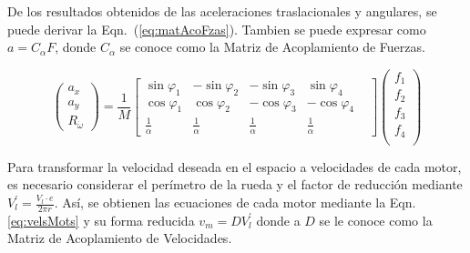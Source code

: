 \documentclass[twocolumn,10pt]{amrob}
\begin{document}

De los resultados obtenidos de las aceleraciones traslacionales y angulares, se puede derivar la Eqn.~(\ref{eq:matAcoFzas}). Tambien se puede expresar como \(a=C_\alpha F \), donde \( C_\alpha \) se conoce como la Matriz de Acoplamiento de Fuerzas. \par

\begin{equation}
  \left(\begin{array}{c}
    a_x \\ a_y \\R_{\dot{\omega}}
  \end{array}\right)= \frac{1}{M}
  \begin{bmatrix}
    \sin\varphi_1 & -\sin\varphi_2 & -\sin\varphi_3 & \sin\varphi_4 \\
    \cos\varphi_1 & \cos\varphi_2 & -\cos\varphi_3 & -\cos\varphi_4 & \\
    \frac{1}{\alpha} & \frac{1}{\alpha}  & \frac{1}{\alpha}  &\frac{1}{\alpha} 
  \end{bmatrix}
  \left(\begin{array}{c}
    f_1 \\ f_2 \\ f_3 \\ f_4  \label{eq:matAcoFzas}\\ 
  \end{array}\right) 
\end{equation}

Para transformar la velocidad deseada en el espacio a velocidades de cada motor, es necesario considerar el perímetro de la rueda y el factor de reducción mediante \(V_{l}^{'} = \frac{ V_l \cdot e } { 2 \pi r} \). Así, se obtienen las ecuaciones de cada motor mediante la Eqn. \eqref{eq:velsMots}  y su forma reducida \(v_m = D V_{l}^{'}\) donde a \( D \) se le conoce como la Matriz de Acoplamiento de Velocidades. \par 
\end{document}

